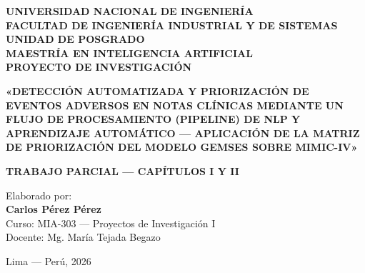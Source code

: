 
\begin{titlepage}
\centering

{\large\bfseries UNIVERSIDAD NACIONAL DE INGENIERÍA}\\[4pt]
{\normalsize\bfseries FACULTAD DE INGENIERÍA INDUSTRIAL Y DE SISTEMAS}\\[4pt]
{\normalsize\bfseries UNIDAD DE POSGRADO}\\[2pt]
{\normalsize\bfseries MAESTRÍA EN INTELIGENCIA ARTIFICIAL}\\[40pt]

{\Large\bfseries\color{black} PROYECTO DE INVESTIGACIÓN}\\[28pt]

\begin{minipage}{0.88\textwidth}
\centering
{\normalsize\bfseries
«DETECCIÓN AUTOMATIZADA Y PRIORIZACIÓN DE EVENTOS ADVERSOS EN
NOTAS CLÍNICAS MEDIANTE UN FLUJO DE PROCESAMIENTO (PIPELINE) DE
NLP Y APRENDIZAJE AUTOMÁTICO --- APLICACIÓN DE LA MATRIZ DE
PRIORIZACIÓN DEL MODELO GEMSES SOBRE MIMIC-IV»
}
\end{minipage}

\vspace{28pt}
{\normalsize\bfseries TRABAJO PARCIAL --- CAPÍTULOS I Y II}

\vfill

\begin{flushleft}
{\normalsize Elaborado por:}\\[4pt]
{\normalsize\bfseries Carlos Pérez Pérez}\\[14pt]
{\normalsize Curso: MIA-303 --- Proyectos de Investigación I}\\[6pt]
{\normalsize Docente: Mg. María Tejada Begazo}
\end{flushleft}

\vspace{30pt}
{\normalsize Lima --- Perú, 2026}

\end{titlepage}
